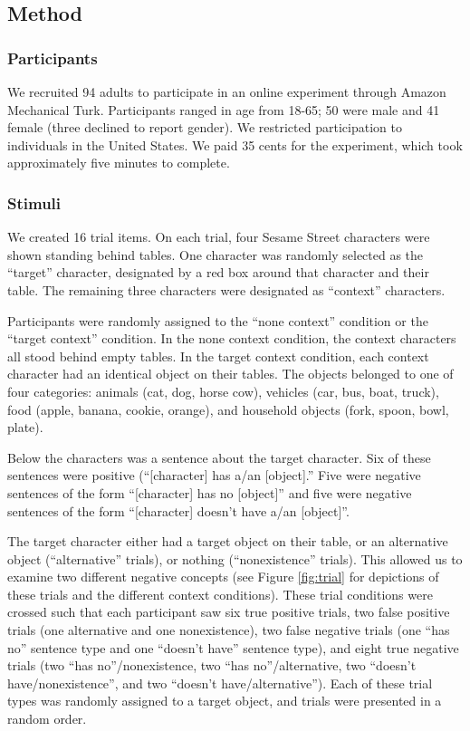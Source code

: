 \documentclass[10pt,letterpaper]{article}
\begin{document}
\subsection{Method}

\subsubsection{Participants}

We recruited 94 adults to participate in an online experiment through Amazon Mechanical Turk.  Participants ranged in age from 18-65; 50 were male and 41 female (three declined to report gender).  We restricted participation to individuals in the United States. We paid 35 cents for the experiment, which took approximately five minutes to complete.  

\subsubsection{Stimuli}

We created 16 trial items. On each trial, four Sesame Street characters were shown standing behind tables.  One character was randomly selected as the ``target'' character, designated by a red box around that character and their table. The remaining three characters were designated as ``context'' characters.

Participants were randomly assigned to the ``none context'' condition or the ``target context'' condition.  In the none context condition, the context characters all stood behind empty tables.  In the target context condition, each context character had an identical object on their tables.  The objects belonged to one of four categories: animals (cat, dog, horse cow), vehicles (car, bus, boat, truck), food (apple, banana, cookie, orange), and household objects (fork, spoon, bowl, plate).  

Below the characters was a sentence about the target character.  Six of these sentences were positive (``[character] has a/an [object].''  Five were negative sentences of the form ``[character] has no [object]'' and five were negative sentences of the form ``[character] doesn't have a/an [object]''.  

The target character either had a target object on their table, or an alternative object (``alternative'' trials), or nothing (``nonexistence'' trials).  This allowed us to examine two different negative concepts (see Figure \ref{fig:trial} for depictions of these trials and the different context conditions).  These trial conditions were crossed such that each participant saw six true positive trials, two false positive trials (one alternative and one nonexistence), two false negative trials (one ``has no'' sentence type and one ``doesn't have'' sentence type), and eight true negative trials (two ``has no''/nonexistence, two ``has no''/alternative, two ``doesn't have/nonexistence'', and two ``doesn't have/alternative'').  Each of these trial types was randomly assigned to a target object, and trials were presented in a random order.  
\end{document}
